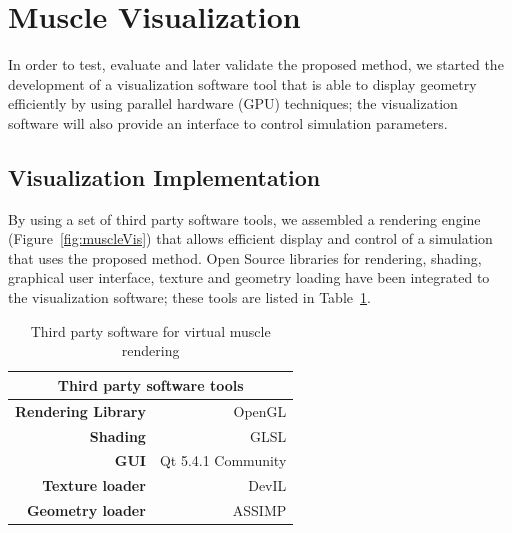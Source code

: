 \section{Muscle Visualization}
\label{sec:muscleVis}
In order to test, evaluate and later validate the proposed method, we started the development of a visualization software tool that is able to display geometry efficiently by using parallel hardware (GPU) techniques; the visualization software will also provide an interface to control simulation parameters.


\subsection{Visualization Implementation}

By using a set of third party software tools, we assembled a rendering engine (Figure~\ref{fig:muscleVis}) that allows efficient display and control of a simulation that uses the proposed method. Open Source libraries for rendering, shading, graphical user interface, texture and geometry loading have been integrated to the visualization software; these tools are listed in Table~\ref{tab:thirdSw}.


\begin{table}[htbp]
  \centering
  \caption{Third party software for virtual muscle rendering}
    \begin{tabular}{rr}
    \toprule
    \multicolumn{2}{c}{\textbf{Third party software tools}} \\
    \midrule
    \textbf{Rendering Library} & OpenGL \\
    \textbf{Shading} & GLSL \\
    \textbf{GUI} & Qt 5.4.1 Community \\
    \textbf{Texture loader} & DevIL \\
    \textbf{Geometry loader} & ASSIMP \\
    \bottomrule
    \end{tabular}%
  \label{tab:thirdSw}%
\end{table}%

